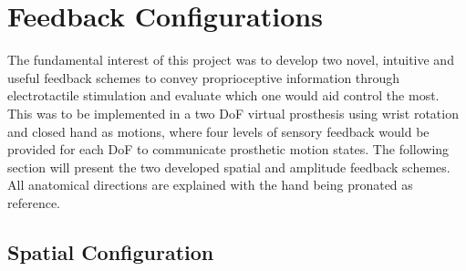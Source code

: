 \section{Feedback Configurations} \label{sec:feed}

The fundamental interest of this project was to develop two novel, intuitive and useful feedback schemes to convey proprioceptive information through electrotactile stimulation and evaluate which one would aid control the most. This was to be implemented in a two DoF virtual prosthesis using wrist rotation and closed hand as motions, where four levels of sensory feedback would be provided for each DoF to communicate prosthetic motion states. The following section will present the two developed spatial and amplitude feedback schemes. All anatomical directions are explained with the hand being pronated as reference.      

\subsection{Spatial Configuration}

